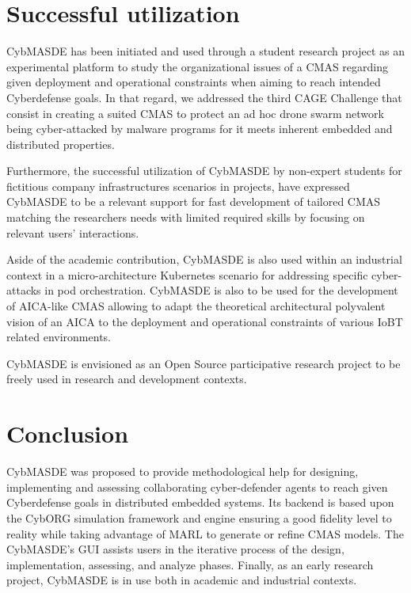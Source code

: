 \documentclass[sigconf]{aamas}
\begin{document}

\section{Successful utilization}

CybMASDE has been initiated and used through a student research project as an experimental platform to study the organizational issues of a CMAS regarding given deployment and operational constraints when aiming to reach intended Cyberdefense goals. In that regard, we addressed the third CAGE Challenge\cite{cage_challenge_3_announcement2022} that consist in creating a suited CMAS to protect an ad hoc drone swarm network being cyber-attacked by malware programs for it meets inherent embedded and distributed properties.

Furthermore, the successful utilization of CybMASDE by non-expert students for fictitious company infrastructures scenarios in projects, have expressed CybMASDE to be a relevant support for fast development of tailored CMAS matching the researchers needs with limited required skills by focusing on relevant users' interactions.

Aside of the academic contribution, CybMASDE is also used within an industrial context in a micro-architecture Kubernetes scenario for addressing specific cyber-attacks in pod orchestration. CybMASDE is also to be used for the development of AICA-like CMAS allowing to adapt the theoretical architectural polyvalent vision of an AICA to the deployment and operational constraints of various IoBT related environments.

CybMASDE is envisioned as an Open Source participative research project to be freely used in research and development contexts.



\section{Conclusion}

CybMASDE was proposed to provide methodological help for designing, implementing and assessing collaborating cyber-defender agents to reach given Cyberdefense goals in distributed embedded systems. Its backend is based upon the CybORG simulation framework and engine ensuring a good fidelity level to reality while taking advantage of MARL to generate or refine CMAS models.
The CybMASDE's GUI assists users in the iterative process of the design, implementation, assessing, and analyze phases. Finally, as an early research project, CybMASDE is in use both in academic and industrial contexts.
\end{document}
